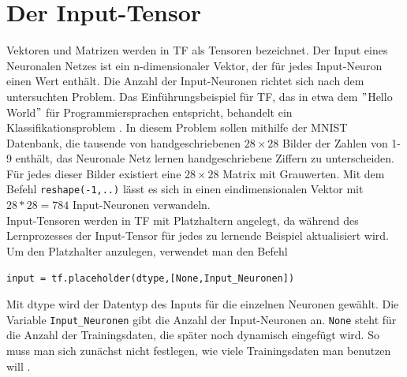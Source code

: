 \section{Der Input-Tensor}
Vektoren und Matrizen werden in \gls{TF} als Tensoren bezeichnet. Der Input eines Neuronalen Netzes ist ein n-dimensionaler Vektor, der f\"ur jedes Input-Neuron einen Wert enth\"alt. Die Anzahl der Input-Neuronen richtet sich nach dem untersuchten Problem. Das Einf\"uhrungsbeispiel f\"ur \gls{TF}, das in etwa dem $"$Hello World$"$ f\"ur Programmiersprachen entspricht, behandelt ein Klassifikationsproblem \cite{handson}. In diesem Problem sollen mithilfe der \gls{MNIST} Datenbank, die tausende von handgeschriebenen $28 \times 28$ Bilder der Zahlen von 1-9 enth\"alt, das Neuronale Netz lernen handgeschriebene Ziffern zu unterscheiden. F\"ur jedes dieser Bilder existiert eine $28 \times 28$ Matrix mit Grauwerten. Mit dem Befehl \lstinline$reshape(-1,..)$ \cite{handson} l\"asst es sich in einen eindimensionalen Vektor mit  $28*28=784$ Input-Neuronen verwandeln.\\
Input-Tensoren werden in \gls{TF} mit Platzhaltern angelegt, da w\"ahrend des Lernprozesses der Input-Tensor f\"ur jedes zu lernende Beispiel aktualisiert wird. Um den Platzhalter anzulegen, verwendet man den Befehl \cite{cookbook}
\vspace{0.3cm}
\begin{lstlisting}
input = tf.placeholder(dtype,[None,Input_Neuronen])
\end{lstlisting}
Mit dtype wird der Datentyp des Inputs f\"ur die einzelnen Neuronen gew\"ahlt. Die Variable \lstinline$Input_Neuronen$ gibt die Anzahl der Input-Neuronen an. \lstinline$None$ steht f\"ur die Anzahl der Trainingsdaten, die sp\"ater noch dynamisch eingef\"ugt wird. So muss man sich zun\"achst nicht festlegen, wie viele Trainingsdaten man benutzen will \cite{handson}. 



